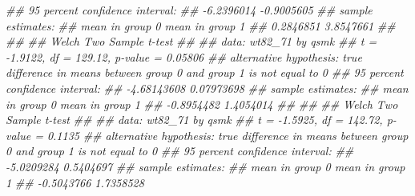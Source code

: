 \documentclass[
  10pt,
  a4paper,
]{book}
\newenvironment{Shaded}{\begin{snugshade}}{\end{snugshade}}
\newcommand{\DocumentationTok}[1]{\textcolor[rgb]{0.37,0.37,0.37}{\textit{#1}}}
\begin{document}
\begin{Shaded}
\begin{Highlighting}[]
\DocumentationTok{\#\# 95 percent confidence interval:}
\DocumentationTok{\#\#  {-}6.2396014 {-}0.9005605}
\DocumentationTok{\#\# sample estimates:}
\DocumentationTok{\#\# mean in group 0 mean in group 1 }
\DocumentationTok{\#\#       0.2846851       3.8547661 }
\DocumentationTok{\#\# }
\DocumentationTok{\#\# }
\DocumentationTok{\#\#  Welch Two Sample t{-}test}
\DocumentationTok{\#\# }
\DocumentationTok{\#\# data:  wt82\_71 by qsmk}
\DocumentationTok{\#\# t = {-}1.9122, df = 129.12, p{-}value = 0.05806}
\DocumentationTok{\#\# alternative hypothesis: true difference in means between group 0 and group 1 is not equal to 0}
\DocumentationTok{\#\# 95 percent confidence interval:}
\DocumentationTok{\#\#  {-}4.68143608  0.07973698}
\DocumentationTok{\#\# sample estimates:}
\DocumentationTok{\#\# mean in group 0 mean in group 1 }
\DocumentationTok{\#\#      {-}0.8954482       1.4054014 }
\DocumentationTok{\#\# }
\DocumentationTok{\#\# }
\DocumentationTok{\#\#  Welch Two Sample t{-}test}
\DocumentationTok{\#\# }
\DocumentationTok{\#\# data:  wt82\_71 by qsmk}
\DocumentationTok{\#\# t = {-}1.5925, df = 142.72, p{-}value = 0.1135}
\DocumentationTok{\#\# alternative hypothesis: true difference in means between group 0 and group 1 is not equal to 0}
\DocumentationTok{\#\# 95 percent confidence interval:}
\DocumentationTok{\#\#  {-}5.0209284  0.5404697}
\DocumentationTok{\#\# sample estimates:}
\DocumentationTok{\#\# mean in group 0 mean in group 1 }
\DocumentationTok{\#\#      {-}0.5043766       1.7358528}


\end{Highlighting}
\end{Shaded}
\end{document}
